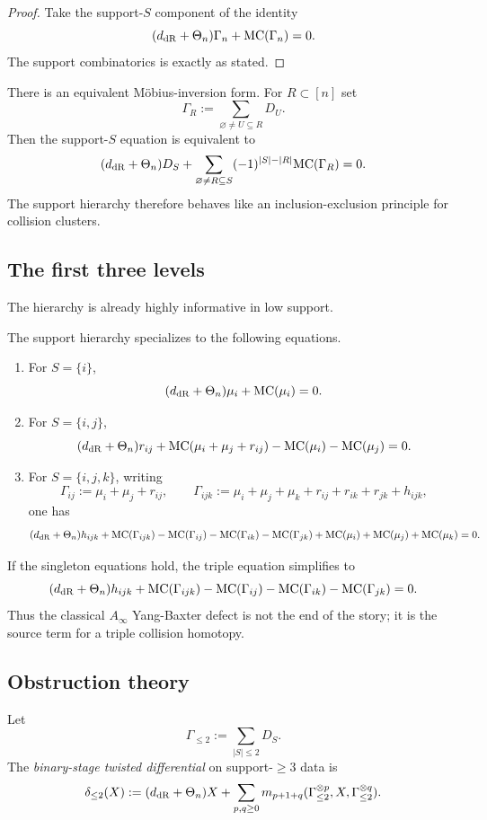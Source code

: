 \begin{proof}
Take the support-$S$ component of the identity
\[
 (d_{\mathrm{dR}}+\Theta_n)\Gamma_n+\mathrm{MC}(\Gamma_n)=0.
\]
The support combinatorics is exactly as stated.
\end{proof}

There is an equivalent Möbius-inversion form. For $R\subset[n]$ set
\[
 \Gamma_R:=\sum_{\varnothing\neq U\subseteq R}D_U.
\]
Then the support-$S$ equation is equivalent to
\[
 (d_{\mathrm{dR}}+\Theta_n)D_S + \sum_{\varnothing\neq R\subseteq S}(-1)^{|S|-|R|}\mathrm{MC}(\Gamma_R)=0.
\]
The support hierarchy therefore behaves like an inclusion-exclusion principle for collision clusters.

\subsection{The first three levels}
The hierarchy is already highly informative in low support.

\begin{corollary}\label{cor:first-three}
The support hierarchy specializes to the following equations.
\begin{enumerate}[label=\textup{(\roman*)}]
 \item For $S=\{i\}$,
 \[
 (d_{\mathrm{dR}}+\Theta_n)\mu_i + \mathrm{MC}(\mu_i)=0.
 \]
 \item For $S=\{i,j\}$,
 \[
 (d_{\mathrm{dR}}+\Theta_n)r_{ij} + \mathrm{MC}(\mu_i+\mu_j+r_{ij}) - \mathrm{MC}(\mu_i)-\mathrm{MC}(\mu_j)=0.
 \]
 \item For $S=\{i,j,k\}$, writing
 \[
 \Gamma_{ij}:=\mu_i+\mu_j+r_{ij},
 \qquad
 \Gamma_{ijk}:=\mu_i+\mu_j+\mu_k+r_{ij}+r_{ik}+r_{jk}+h_{ijk},
 \]
 one has
 \[
 (d_{\mathrm{dR}}+\Theta_n)h_{ijk} + \mathrm{MC}(\Gamma_{ijk})-\mathrm{MC}(\Gamma_{ij})-\mathrm{MC}(\Gamma_{ik})-\mathrm{MC}(\Gamma_{jk})+\mathrm{MC}(\mu_i)+\mathrm{MC}(\mu_j)+\mathrm{MC}(\mu_k)=0.
 \]
\end{enumerate}
\end{corollary}

If the singleton equations hold, the triple equation simplifies to
\[
 (d_{\mathrm{dR}}+\Theta_n)h_{ijk} + \mathrm{MC}(\Gamma_{ijk})-\mathrm{MC}(\Gamma_{ij})-\mathrm{MC}(\Gamma_{ik})-\mathrm{MC}(\Gamma_{jk})=0.
\]
Thus the classical $A_\infty$ Yang-Baxter defect is not the end of the story; it is the source term for a triple collision homotopy.

\subsection{Obstruction theory}

\begin{definition}
Let
\[
 \Gamma_{\le 2}:=\sum_{|S|\le 2}D_S.
\]
The \emph{binary-stage twisted differential} on support-$\ge 3$ data is
\[
 \delta_{\le 2}(X)
 :=
 (d_{\mathrm{dR}}+\Theta_n)X + \sum_{p,q\ge 0} m_{p+1+q}(\Gamma_{\le 2}^{\otimes p},X,\Gamma_{\le 2}^{\otimes q}).
\]
\end{definition}

